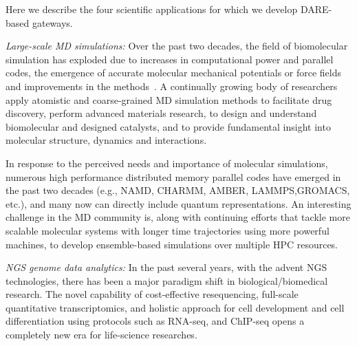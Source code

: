 \documentclass{sig-alternate}
\begin{document}
Here we describe the four scientific applications for which we develop
DARE-based gateways.


\textit{Large-scale MD simulations:} Over the past two
decades, the field of biomolecular simulation has exploded due to
increases in computational power and parallel codes, the emergence of
accurate molecular mechanical potentials or force fields and
improvements in the methods~\cite{amber,mackerell2008,adcock2006}. A
continually growing body of researchers apply atomistic and
coarse-grained MD simulation methods to
facilitate drug discovery, perform advanced materials research, to
design and understand biomolecular and designed catalysts, and to
provide fundamental insight into molecular structure, dynamics and
interactions.


In response to the perceived needs and importance of molecular
simulations, numerous high performance distributed memory parallel
codes have emerged in the past two decades (e.g., NAMD, CHARMM,
AMBER, LAMMPS,GROMACS, etc.), and many now can directly include
quantum representations.  An interesting challenge in the MD community
is, along with continuing efforts that tackle more scalable molecular
systems with longer time trajectories using more powerful machines, to
develop ensemble-based simulations over multiple HPC resources.

\textit{NGS genome data analytics:} In the past several years, with
the advent NGS technologies\cite{mardis2008-tig,metzker2010}, there
has been a major paradigm shift in biological/biomedical research.
The novel capability of cost-effective resequencing, full-scale
quantitative transcriptomics, and holistic approach for cell
development and cell differentiation using protocols such as RNA-seq,
and ChIP-seq opens a completely new era for life-science
researches\cite{sorek2010}.  
\end{document}
